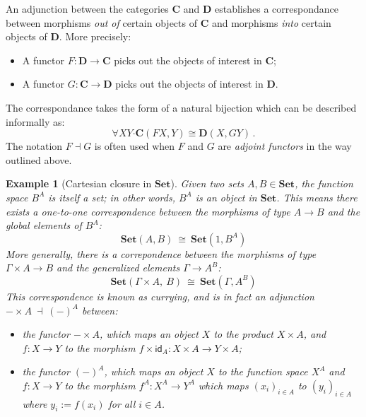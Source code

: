 \documentclass[11pt,oneside,draft]{book}
\newtheorem{example}[theorem]{Example}
\theoremstyle{definition}
\newcommand{\kw}[1]{\ensuremath{ \mathsf{#1} }}
\newcommand{\bdot}{\boldsymbol{\cdot}}
\begin{document}
An adjunction between the categories $\mathbf{C}$ and $\mathbf{D}$
establishes a correspondance between
morphisms \emph{out of} certain objects of $\mathbf{C}$ and
morphisms \emph{into} certain objects of $\mathbf{D}$.
More precisely:
\begin{itemize}
  \item
    A functor $F : \mathbf{D} \rightarrow \mathbf{C}$
    picks out the objects of interest in $\mathbf{C}$;
  \item
    A functor $G : \mathbf{C} \rightarrow \mathbf{D}$
    picks out the objects of interest in $\mathbf{D}$.
\end{itemize}
The correspondance takes the form of a natural bijection
which can be described informally as:
\[
  \forall X Y \bdot \mathbf{C}(F X, Y) \cong \mathbf{D}(X, G Y)
  \,.
\]
The notation $F \dashv G$ is often used
when $F$ and $G$ are \emph{adjoint functors}
in the way outlined above.


\begin{example}[Cartesian closure in $\mathbf{Set}$] \label{ex:ccset} %
Given two sets $A, B \in \mathbf{Set}$,
the function space $B^A$
is itself a set;
in other words, $B^A$ is an object in $\mathbf{Set}$.
This means there exists a one-to-one correspondence
between the morphisms of type $A \rightarrow B$
and the global elements of $B^A$:
\[
  \mathbf{Set}(A, B)
  \: \cong \:
  \mathbf{Set}(1, B^A)
\]
More generally,
there is a correpondence
between the morphisms of type
$\Gamma \times A \rightarrow B$
and the generalized elements
$\Gamma \rightarrow A^B$:
\[
  \mathbf{Set}(\Gamma \times A, \: B)
  \: \cong \:
  \mathbf{Set}(\Gamma, A^B)
\]
This correspondence is known as \emph{currying},
and is in fact
an adjunction
$
  - \times A \: \dashv \: (-)^A
$
between:
\begin{itemize}
  \item the functor ${-} \times A$,
    which maps an object $X$ to the product $X \times A$,
    and $f : X \rightarrow Y$ to the morphism
    $f \times \kw{id}_A : X \times A \rightarrow Y \times A$;
  \item the functor $(-)^A$,
    which maps an object $X$ to the function space $X^A$
    and $f : X \rightarrow Y$ to the morphism
    $f^A : X^A \rightarrow Y^A$
    which maps $(x_i)_{i \in A}$
    to $(y_i)_{i \in A}$
    where $y_i := f(x_i)$ for all $i \in A$.
\end{itemize}
\end{example}
\end{document}
